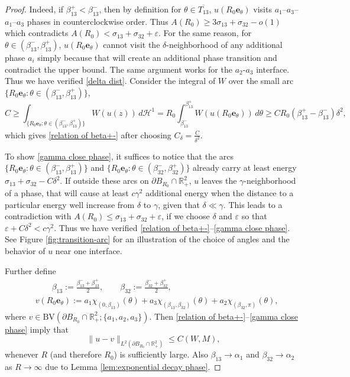 \documentclass[leqno,11pt]{amsart}
\let\pa=\partial
\let\al=\alpha
\let\g=\gamma
\let\d=\delta
\let\f=\frac
\let\e=\varepsilon
\let\pa=\partial
\theoremstyle{remark}
\newcommand{\BR}{\mathbb{R}}
\newcommand{\ch}{\mathcal{H}^1}
\begin{document}
\begin{proof}
Indeed, if $\beta_{13}^+<\beta_{13}^-$, then by definition for $\theta\in \overline{T_{13}}$, $u(R_0\mathbf{e}_\theta)$ visits $a_1$--$a_3$--$a_1$--$a_3$ phases in counterclockwise order. Thus $A(R_0)\geq 3\sigma_{13}+\sigma_{32}-o(1)$ which contradicts $A(R_0)<\sigma_{13}+\sigma_{32}+\e$. For the same reason, for $\theta\in (\beta_{13}^-,\beta_{13}^+)$, $u(R_0\mathbf{e}_{\theta})$ cannot visit the $\delta$-neighborhood of any additional phase $a_i$ simply because that will create an additional phase transition and contradict the upper bound. The same argument works for the $a_2$-$a_3$ interface. Thus we have verified \eqref{delta dist}. Consider the integral of $W$ over the small arc $\{R_0\mathbf{e}_{\theta}:\theta\in (\beta_{13}^-,\beta_{13}^+)\}$,
\[
C\geq \int_{\{R_0\mathbf{e}_{\theta}:\theta\in (\beta_{13}^-,\beta_{13}^+)\}} W(u(z))\,d\ch=  R_0\int_{\beta_{13}^-}^{\beta_{13}^+} W(u(R_0\mathbf{e}_\theta))\,d\theta\geq CR_0(\beta_{13}^+-\beta_{13}^-)\delta^2,
\]
which gives \eqref{relation of beta+-} after choosing $C_\delta=\frac{C}{\d^2}$. 

To show \eqref{gamma close phase}, it suffices to notice that the arcs $\{R_0\mathbf{e}_{\theta}:\theta\in (\beta_{13}^-,\beta_{13}^+)\}$ and $\{R_0\mathbf{e}_{\theta}:\theta\in (\beta_{32}^-,\beta_{32}^+)\}$ already carry at least energy $\sigma_{13}+\sigma_{32}-C\delta^2$. If outside these arcs on $\pa B_{R_0}\cap\BR_+^2$, $u$ leaves the $\g$-neighborhood of a phase, that will cause at least $c\g^2$ additional energy when the distance to a particular energy well increase from $\delta$ to $\g$, given that $\d\ll \g$. This leads to a contradiction with $A(R_0)\leq \sigma_{13}+\sigma_{32}+\e$, if we choose $\delta$ and $\e$ so that $\e+C\delta^2<c\g^2$. Thus we have verified \eqref{relation of beta+-}--\eqref{gamma close phase}. See Figure \ref{fig:transition-arc} for an illustration of the choice of angles and the behavior of $u$ near one interface.

Further define
\begin{align*}
 &\qquad \beta_{13}:=\f{\beta_{13}^-+\beta_{13}^+}{2},\qquad \beta_{32}:=\f{\beta_{32}^-+\beta_{32}^+}{2},\\
 & v(R_0\mathbf{e}_\theta):= a_1\chi_{(0,\beta_{13})}(\theta)+a_3\chi_{(\beta_{13},\beta_{32})}(\theta)+a_2\chi_{(\beta_{32},\pi)}(\theta),
\end{align*}
where $v\in \mathrm{BV}(\pa B_{R_0}\cap\BR_+^2;\{a_1,a_2,a_3\})$. Then \eqref{relation of beta+-}--\eqref{gamma close phase} imply that 
\begin{equation}\label{u R_0 L2 est}
    \|u-v\|_{L^2(\pa B_{R_0}\cap \BR_+^2)}\leq C(W,M),
\end{equation}
whenever $R$ (and therefore $R_0$) is sufficiently large. Also $\beta_{13}\to \al_1$ and $\beta_{32}\to \al_2$ as $R\to\infty$ due to Lemma \ref{lem:exponential decay phase}.


\end{proof}
\end{document}
